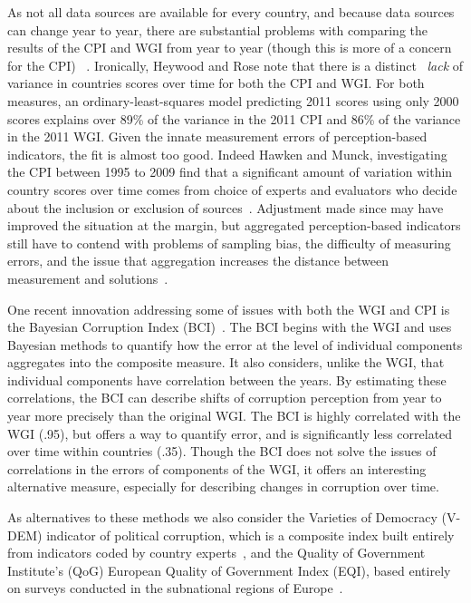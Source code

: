 As not all data sources are available for every country, and because data sources can change year to year, there are substantial problems with comparing the results of the CPI and WGI from year to year (though this is more of a concern for the CPI) ~\cite{heywood2014close}. Ironically, Heywood and Rose note that there is a distinct ~\textit{lack} of variance in countries scores over time for both the CPI and WGI. For both measures, an ordinary-least-squares model predicting 2011 scores using only 2000 scores explains over 89\% of the variance in the 2011 CPI and 86\% of the variance in the 2011 WGI. Given the innate measurement errors of perception-based indicators, the fit is almost too good. Indeed Hawken and Munck, investigating the CPI between 1995 to 2009 find that a significant amount of variation within country scores over time comes from choice of experts and evaluators who decide about the inclusion or exclusion of sources~\cite{hawken2009you}. Adjustment made since may have improved the situation at the margin, but aggregated perception-based indicators still have to contend with problems of sampling bias, the difficulty of measuring errors, and the issue that aggregation increases the distance between measurement and solutions~\cite{urra2007assessing}.

One recent innovation addressing some of issues with both the WGI and CPI is the Bayesian Corruption Index (BCI)~\cite{standaert2015divining}. The BCI begins with the WGI and uses Bayesian methods to quantify how the error at the level of individual components aggregates into the composite measure. It also considers, unlike the WGI, that individual components have correlation between the years. By estimating these correlations, the BCI can describe shifts of corruption perception from year to year more precisely than the original WGI. The BCI is highly correlated with the WGI (.95), but offers a way to quantify error, and is significantly less correlated over time within countries (.35). Though the BCI does not solve the issues of correlations in the errors of components of the WGI, it offers an interesting alternative measure, especially for describing changes in corruption over time.

As alternatives to these methods we also consider the Varieties of Democracy (V-DEM) indicator of political corruption, which is a composite index built entirely from indicators coded by country experts~\cite{coppedge2018v}, and the Quality of Government Institute's (QoG) European Quality of Government Index (EQI), based entirely on surveys conducted in the subnational regions of Europe~\cite{rothstein2013quality}.

